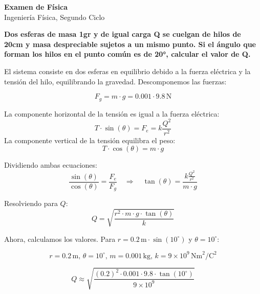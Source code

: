 \documentclass[12pt, answers]{exam} %
\begin{document}
\begin{center}
    \large\textbf{Examen de Física}\\[1em]
    \large Ingeniería Física, Segundo Ciclo\\[1em]
\end{center}

\begin{questions}

    \question \large\textbf{Dos esferas de masa 1gr y de igual carga Q se cuelgan de hilos de 20cm y masa despreciable sujetos a un mismo punto. Si el ángulo que forman los hilos en el punto común es de 20°, calcular el valor de Q.}

    
        El sistema consiste en dos esferas en equilibrio debido a la fuerza eléctrica y la tensión del hilo, equilibrando la gravedad. Descomponemos las fuerzas:
    
        \[
        F_g = m \cdot g = 0.001 \cdot 9.8 \, \text{N}
        \]
    
        La componente horizontal de la tensión es igual a la fuerza eléctrica:
        \[
        T \cdot \sin(\theta) = F_e = k \frac{Q^2}{r^2}
        \]
        La componente vertical de la tensión equilibra el peso:
        \[
        T \cdot \cos(\theta) = m \cdot g
        \]
    
        Dividiendo ambas ecuaciones:
        \[
        \frac{\sin(\theta)}{\cos(\theta)} = \frac{F_e}{F_g} \quad \Rightarrow \quad \tan(\theta) = \frac{k \frac{Q^2}{r^2}}{m \cdot g}
        \]
    
        Resolviendo para $Q$:
        \[
        Q = \sqrt{\frac{r^2 \cdot m \cdot g \cdot \tan(\theta)}{k}}
        \]
    
        Ahora, calculamos los valores. Para $r = 0.2 \, \text{m} \cdot \sin(10^\circ)$ y $\theta = 10^\circ$:
        
        \[
        r = 0.2 \, \text{m}, \, \theta = 10^\circ, \, m = 0.001 \, \text{kg}, \, k = 9 \times 10^9 \, \text{Nm}^2/\text{C}^2
        \]
        
        \[
        Q \approx \sqrt{\frac{(0.2)^2 \cdot 0.001 \cdot 9.8 \cdot \tan(10^\circ)}{9 \times 10^9}}
        \]
  
    
        \vspace{1cm}
        
      \begin{center}
\end{center}
\end{questions}
\end{document}
